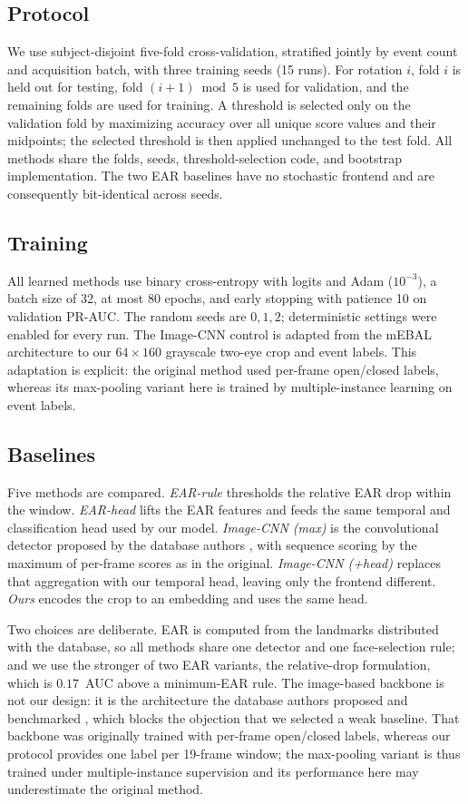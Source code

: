 \documentclass{IEEE_lsens}
\begin{document}
\subsection{Protocol}
We use subject-disjoint five-fold cross-validation, stratified jointly
by event count and acquisition batch, with three training seeds (15
runs). For rotation $i$, fold $i$ is held out for testing, fold
$(i+1)\bmod 5$ is used for validation, and the remaining folds are used
for training. A threshold is selected only on the validation fold by
maximizing accuracy over all unique score values and their midpoints;
the selected threshold is then applied unchanged to the test fold. All
methods share the folds, seeds, threshold-selection code, and bootstrap
implementation. The two EAR baselines have no stochastic frontend and
are consequently bit-identical across seeds.

\subsection{Training}
All learned methods use binary cross-entropy with logits and Adam
($10^{-3}$), a batch size of 32, at most 80 epochs, and early stopping
with patience 10 on validation PR-AUC. The random seeds are $0,1,2$;
deterministic settings were enabled for every run. The Image-CNN
control is adapted from the mEBAL architecture \cite{daza2020} to our
$64\times160$ grayscale two-eye crop and event labels. This adaptation
is explicit: the original method used per-frame open/closed labels,
whereas its max-pooling variant here is trained by multiple-instance
learning on event labels.

\subsection{Baselines}
Five methods are compared. \emph{EAR-rule} thresholds the relative EAR
drop within the window. \emph{EAR-head} lifts the EAR features and feeds
the same temporal and classification head used by our model.
\emph{Image-CNN (max)} is the convolutional detector proposed by the
database authors \cite{daza2020}, with sequence scoring by the maximum
of per-frame scores as in the original. \emph{Image-CNN (+head)}
replaces that aggregation with our temporal head, leaving only the
frontend different. \emph{Ours} encodes the crop to an embedding and
uses the same head.

Two choices are deliberate. EAR is computed from the landmarks
distributed with the database, so all methods share one detector and one
face-selection rule; and we use the stronger of two EAR variants, the
relative-drop formulation, which is $0.17$~AUC above a minimum-EAR
rule. The image-based backbone is not our design: it is the architecture
the database authors proposed and benchmarked \cite{daza2020}, which
blocks the objection that we selected a weak baseline. That backbone was
originally trained with per-frame open/closed labels, whereas our
protocol provides one label per 19-frame window; the max-pooling variant
is thus trained under multiple-instance supervision and its performance
here may underestimate the original method.
\end{document}
